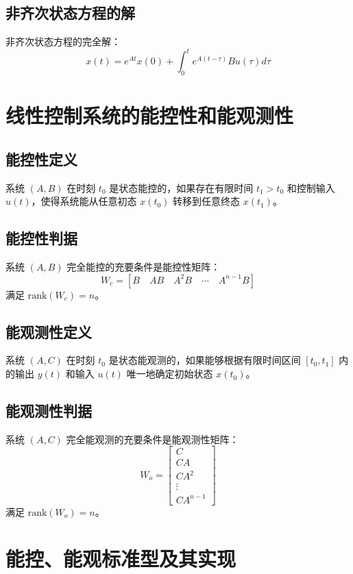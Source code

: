\documentclass[12pt,a4paper]{article}
\begin{document}
\subsection{非齐次状态方程的解}
非齐次状态方程的完全解：
\[x(t) = e^{At}x(0) + \int_0^t e^{A(t-\tau)}Bu(\tau)d\tau\]

\section{线性控制系统的能控性和能观测性}

\subsection{能控性定义}
系统 $(A, B)$ 在时刻 $t_0$ 是状态能控的，如果存在有限时间 $t_1 > t_0$ 和控制输入 $u(t)$，使得系统能从任意初态 $x(t_0)$ 转移到任意终态 $x(t_1)$。

\subsection{能控性判据}
系统 $(A, B)$ 完全能控的充要条件是能控性矩阵：
\[W_c = [B \quad AB \quad A^2B \quad \cdots \quad A^{n-1}B]\]
满足 $\text{rank}(W_c) = n$。

\subsection{能观测性定义}
系统 $(A, C)$ 在时刻 $t_0$ 是状态能观测的，如果能够根据有限时间区间 $[t_0, t_1]$ 内的输出 $y(t)$ 和输入 $u(t)$ 唯一地确定初始状态 $x(t_0)$。

\subsection{能观测性判据}
系统 $(A, C)$ 完全能观测的充要条件是能观测性矩阵：
\[W_o = \begin{bmatrix} C \\ CA \\ CA^2 \\ \vdots \\ CA^{n-1} \end{bmatrix}\]
满足 $\text{rank}(W_o) = n$。

\section{能控、能观标准型及其实现}
\end{document}
